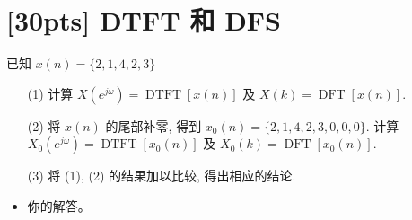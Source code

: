 \documentclass[a4paper,UTF8]{article}
\numberwithin{equation}{section}
\begin{document}
	\newpage
	\section{[30pts] DTFT 和 DFS}
	已知 $x(n)=\{2,1,4,2,3\}$
	\begin{itemize}
		\item[(1)]计算 $X({e}^{{j}\omega})=\operatorname{DTFT}[x(n)]$ 及 $X(k)=\operatorname{DFT}[x(n)]$.
		\item[(2)]将 $x(n)$ 的尾部补零, 得到 $x_0(n)=\{2, 1,4,2,3,0,0,0\}$. 计算 $X_0({e}^{j \omega})=\operatorname{DTFT}[x_0(n)]$ 及 $X_0(k)=\operatorname{DFT}[x_0(n)]$.
		\item[(3)]将 (1), (2) 的结果加以比较, 得出相应的结论.
	\end{itemize}
	
	\begin{framed}
		\begin{spacing}{1.5}
			\begin{itemize}
				\item 你的解答。
			\end{itemize}
		\end{spacing}
	\end{framed}
	
	
\end{document}
